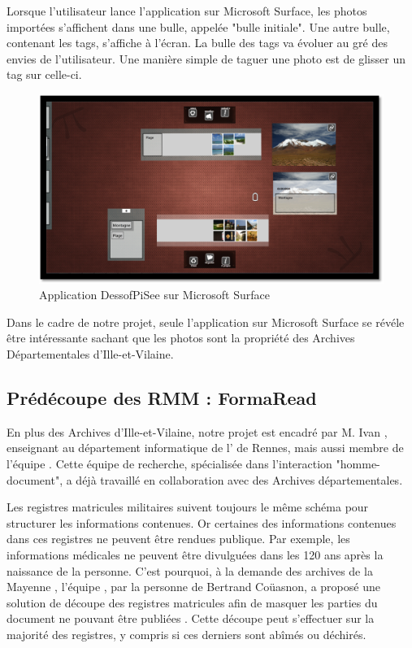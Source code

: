 \documentclass[a4paper]{article}
\begin{document}
Lorsque l'utilisateur lance l'application sur Microsoft Surface, les photos import\'ees s'affichent dans une bulle, appel\'ee "bulle initiale". Une autre bulle, contenant les tags, s'affiche \`a l'\'ecran. La bulle des tags va \'evoluer au gr\'e des envies de l'utilisateur. Une mani\`ere simple de taguer une photo est de glisser un tag sur celle-ci.

\begin{figure}[H]
\centering
\includegraphics[width=1.0\textwidth]{dessofpisee.png}
\caption{\label{fig:dessofpisee}Application DessofPiSee sur Microsoft Surface}
\end{figure}

Dans le cadre de notre projet, seule l'application sur Microsoft Surface se r\'ev\'ele \^etre int\'eressante sachant que les photos sont la propri\'et\'e des Archives D\'epartementales d'Ille-et-Vilaine.

\subsection{Pr\'ed\'ecoupe des RMM : FormaRead}
\label{subsec:formaread}

	En plus des Archives d'Ille-et-Vilaine, notre projet est encadr\'e par M. Ivan , enseignant au d\'epartement informatique de l' de Rennes, mais aussi membre de l'\'equipe . Cette \'equipe de recherche, sp\'ecialis\'ee dans l'interaction "homme-document", a d\'ej\`a travaill\'e en collaboration avec des Archives d\'epartementales.

	Les registres matricules militaires suivent toujours le m\^eme sch\'ema pour structurer les informations contenues. Or certaines des informations contenues dans ces registres ne peuvent \^etre rendues publique. Par exemple, les informations m\'edicales ne peuvent \^etre divulgu\'ees dans les 120 ans apr\`es la naissance de la personne. C'est pourquoi, \`a la demande des archives de la Mayenne \cite{archive53}, l'\'equipe , par la personne de Bertrand Co\"uasnon, a propos\'e une solution de d\'ecoupe des registres matricules afin de masquer les parties du document ne pouvant \^etre publi\'ees \cite{formaread}. Cette d\'ecoupe peut s'effectuer sur la majorit\'e des registres, y compris si ces derniers sont ab\^im\'es ou d\'echir\'es.
\end{document}
